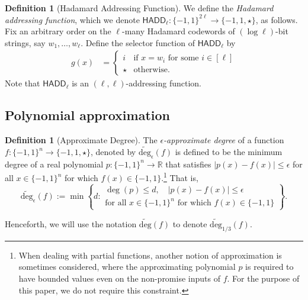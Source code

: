 \documentclass[10pt,a4paper]{article}
\theoremstyle{definition}
\newtheorem{definition}[theorem]{Definition}
\newcommand{\bra}[1]{\{#1\}}
\newcommand{\pmone}{\bra{-1,1}}
\newcommand{\R}{\mathbb R}
\newcommand{\eps}{\epsilon}
\newcommand{\abs}[1]{\lvert#1\rvert}
\newcommand{\adeg}{\widetilde{\mathrm{deg}}}
\newcommand{\HADD}{\mathsf{HADD}}
\begin{document}
\begin{definition}[Hadamard Addressing Function]\label{defn: hadd}
We define the \emph{Hadamard addressing function}, which we denote $\HADD_\ell : \pmone^{2\ell} \to \bra{-1, 1, \star}$, as follows.
Fix an arbitrary order on the $\ell$-many Hadamard codewords of $(\log \ell)$-bit strings, say $w_1, \dots, w_\ell$.  Define the selector function of $\HADD_\ell$ by
\begin{align*}
g(x) & =\begin{cases}
i & \text{if~} x = w_i \text{~for some~} i \in [\ell]\\
\star & \text{otherwise}.
\end{cases}
\end{align*}
Note that $\HADD_\ell$ is an $(\ell, \ell)$-addressing function.
\end{definition}

\subsection{Polynomial approximation}

\begin{definition}[Approximate Degree]\label{defn: adeg}
The \emph{$\eps$-approximate degree} of a function $f : \pmone^n \to \bra{-1, 1, \star}$, denoted by $\adeg_\eps(f)$ is defined to be the minimum degree of a real polynomial $p : \pmone^n \to \R$ that satisfies $\abs{p(x) - f(x)} \leq \eps$ for all $x \in \pmone^n$ for which $f(x) \in \pmone$.\footnote{When dealing with partial functions, another notion of approximation is sometimes considered, where the approximating polynomial $p$ is required to have bounded values even on the non-promise inputs of $f$.  For the purpose of this paper, we do not require this constraint.} That is,
\[
\adeg_\eps(f):=\min\left\{d:\begin{array}{l}\deg(p)\leq d,\quad |p(x)-f(x)|\leq\epsilon\\\text{for all }x\in\pmone^n\text{ for which }f(x)\in\pmone\end{array}\right\}.
\]
\end{definition}
Henceforth, we will use the notation $\adeg(f)$ to denote $\adeg_{1/3}(f)$.
\end{document}
